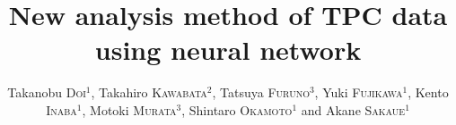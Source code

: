 \documentclass{jps-cp}
\title{New analysis method of TPC data using neural network}
\author{
  Takanobu \textsc{Doi}$^{1}$, Takahiro \textsc{Kawabata}$^{2}$, Tatsuya \textsc{Furuno}$^{3}$,
  Yuki \textsc{Fujikawa}$^{1}$, Kento \textsc{Inaba}$^{1}$, Motoki \textsc{Murata}$^{3}$,
  Shintaro \textsc{Okamoto}$^{1}$ and Akane \textsc{Sakaue}$^{1}$}
\begin{document}
\maketitle

\section{}

% 
% 
% 
% 
% 
% 
% 
% 
% 
% 
\end{document}

